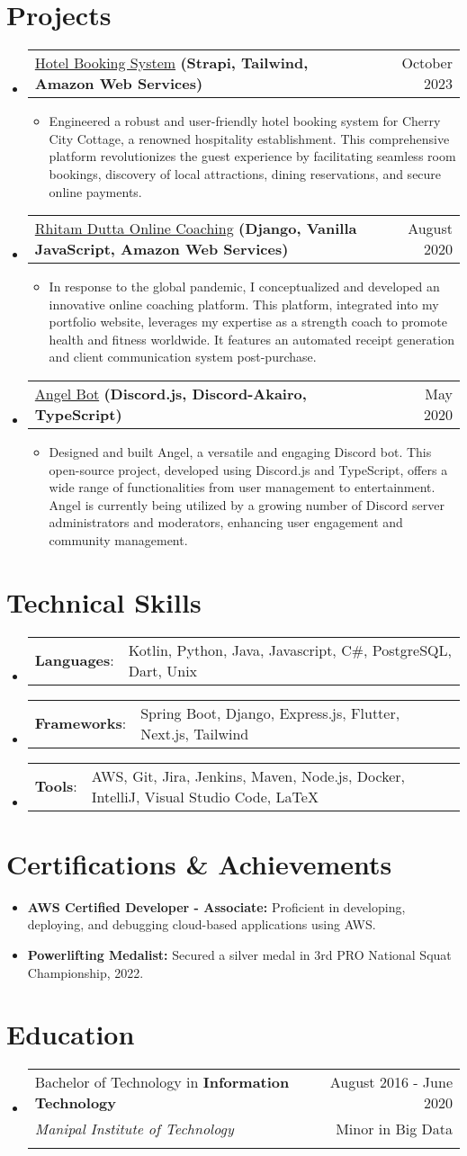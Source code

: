 \documentclass[letterpaper,11pt]{article}
\makeatletter
\newcommand{\sectionStart}{
  \begin{itemize}[label={},leftmargin=0in]
}
\newcommand{\sectionEnd}{
  \end{itemize}
}
\newcommand{\educationItem}[5]{
  \vspace{-1pt}
  \item
  \begin{tabular*}{\textwidth}{l@{\extracolsep{\fill}}r@{}}
    {#1 in \textbf{#2}}  & {#3}\\
    {\textit{#4}} & {#5}\\\vspace{-18pt}
  \end{tabular*}
  \vspace{-5pt}
}
\newcommand{\skillItem}[2]{
  \vspace{-1pt}
  \item
  \begin{tabular*}{1.0\textwidth}{l@{}l@{}}
    {\textbf{#1}: } & {#2}
  \end{tabular*}\vspace{-17pt}
}
\newcommand{\projectHeading}[4]{
  \vspace{-1pt}
  \item
  \begin{tabular*}{1.0\textwidth}{l@{\extracolsep{\fill}}r@{}}
    \normalsize{{\href{#1}{#2}} \textbf{#3}} & #4 \\
  \end{tabular*}\vspace{-5pt}
}
\newcommand{\listStart}{\begin{itemize}}
\newcommand{\listEnd}{\end{itemize}\vspace{-5pt}}
\newcommand{\bulletItem}[1]{
  \item
  \small{
    {#1 \vspace{-1.8pt}}
  }
}
\newcommand{\certItem}[2]{
  \item \textbf{#1} \small{#2}
}
\makeatother
\begin{document}
\section{Projects}
\sectionStart
\projectHeading
    {https://github.com/exthazor/CherryCityCottage-Frontend/}
    {Hotel Booking System}
    {(Strapi, Tailwind, Amazon Web Services)}
    {October 2023}
  \listStart
    \bulletItem
      {Engineered a robust and user-friendly hotel booking system for Cherry City Cottage, a renowned hospitality establishment. This comprehensive platform revolutionizes the guest experience by facilitating seamless room bookings, discovery of local attractions, dining reservations, and secure online payments.}
  \listEnd
  \projectHeading
    {https://github.com/exthazor/rhitamdutta/}
    {Rhitam Dutta Online Coaching}
    {(Django, Vanilla JavaScript, Amazon Web Services)}
    {August 2020}
  \listStart
    \bulletItem
      {In response to the global pandemic, I conceptualized and developed an innovative online coaching platform. This platform, integrated into my portfolio website, leverages my expertise as a strength coach to promote health and fitness worldwide. It features an automated receipt generation and client communication system post-purchase.}
  \listEnd
  \projectHeading
    {https://github.com/exthazor/angel}
    {Angel Bot}
    {(Discord.js, Discord-Akairo, TypeScript)}
    {May 2020}
  \listStart
    \bulletItem
    {Designed and built Angel, a versatile and engaging Discord bot. This open-source project, developed using Discord.js and TypeScript, offers a wide range of functionalities from user management to entertainment. Angel is currently being utilized by a growing number of Discord server administrators and moderators, enhancing user engagement and community management.}
  \listEnd
\sectionEnd

\section{Technical Skills}
\sectionStart
  \skillItem
    {Languages}
    {Kotlin, Python, Java, Javascript, C\#, PostgreSQL, Dart, Unix}
  \skillItem
    {Frameworks}
    {Spring Boot, Django, Express.js, Flutter, Next.js, Tailwind}
  \skillItem
    {Tools}
    {AWS, Git, Jira, Jenkins, Maven, Node.js, Docker, IntelliJ, Visual Studio Code, \LaTeX\ }
  \vspace{3pt}
\sectionEnd

\section{Certifications \& Achievements}
\sectionStart
    \certItem 
     {AWS Certified Developer - Associate:} {Proficient in developing, deploying, and debugging cloud-based applications using AWS.}
    \certItem 
     {Powerlifting Medalist:} {Secured a silver medal in 3rd PRO National Squat Championship, 2022.}
\sectionEnd


\section{Education}
\sectionStart
  \educationItem
    {Bachelor of Technology} 
    {Information Technology} 
    {August 2016 - June 2020}
    {Manipal Institute of Technology} 
    {Minor in Big Data}
\sectionEnd
\end{document}
